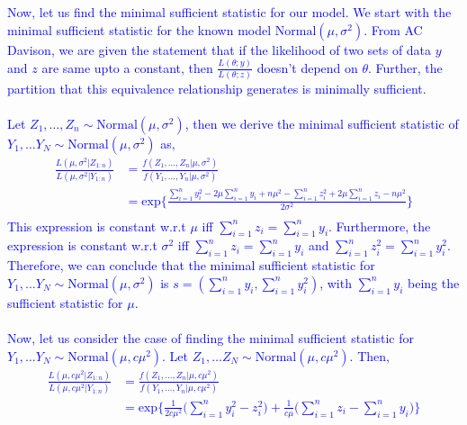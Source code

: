 \documentclass[11pt]{article}
\begin{document}
\textcolor{blue}{Now, let us find the minimal sufficient statistic for our model. We start with the minimal sufficient statistic for the known model $\text{Normal}(\mu, \sigma^2)$. From AC Davison, we are given the statement that if the likelihood of two sets of data $y$ and $z$ are same upto a constant, then $\frac{L(\theta ; y)}{L(\theta ; z)}$ doesn't depend on $\theta$. Further, the partition that this equivalence relationship generates is minimally sufficient. \\ \\
Let $Z_1, \dots, Z_n \sim \text{Normal}(\mu, \sigma^2)$, then we derive the minimal sufficient statistic of $Y_1, \dots Y_N \sim \text{Normal}(\mu, \sigma^2)$ as,
\begin{equation}
  \nonumber
  \begin{aligned}
    \frac{L(\mu, \sigma^2 | Z_{1:n})}{L(\mu, \sigma^2 | Y_{1:n})} & = \frac{f(Z_1, \dots, Z_n|\mu, \sigma^2)}{f(Y_1, \dots, Y_n|\mu, \sigma^2)}\\
    & = \text{exp}\bigg\{\frac{\sum_{i=1}^n y_i^2 - 2\mu\sum_{i=1}^ny_i+n\mu^2-\sum_{i=1}^n z_i^2 + 2\mu\sum_{i=1}^nz_i - n\mu^2}{2 \sigma^2}\bigg\}\\
  \end{aligned}
\end{equation}
This expression is constant w.r.t $\mu$ iff $\sum_{i=1}^{n}z_i = \sum_{i=1}^ny_i$. Furthermore, the expression is constant w.r.t $\sigma^2$ iff $\sum_{i=1}^{n}z_i = \sum_{i=1}^ny_i$ and $\sum_{i=1}^{n}z_i^2 = \sum_{i=1}^ny_i^2$. Therefore, we can conclude that the minimal sufficient statistic for $Y_1, \dots Y_N \sim \text{Normal}(\mu, \sigma^2)$ is $s = (\sum_{i=1}^ny_i,\sum_{i=1}^ny_i^2)$, with $\sum_{i=1}^ny_i$ being the sufficient statistic for $\mu$.\\ \\
Now, let us consider the case of finding the minimal sufficient statistic for $Y_1, \dots Y_N \sim \text{Normal}(\mu, c\mu^2)$. Let $Z_1, \dots Z_N \sim \text{Normal}(\mu, c\mu^2)$. Then,
\begin{equation}
  \nonumber
  \begin{aligned}
    \frac{L(\mu, c\mu^2 | Z_{1:n})}{L(\mu, c\mu^2| Y_{1:n})} & = \frac{f(Z_1, \dots, Z_n|\mu, c\mu^2)}{f(Y_1, \dots, Y_n|\mu, c\mu^2)}\\
    & = \text{exp}\bigg\{\frac{1}{2c\mu^2}\bigg(\sum_{i=1}^ny_i^2-z_i^2\bigg)+\frac{1}{c\mu}\bigg(\sum_{i=1}^nz_i-\sum_{i=1}^ny_i\bigg)\bigg\}
 \end{aligned}
\end{equation}
}
\end{document}
